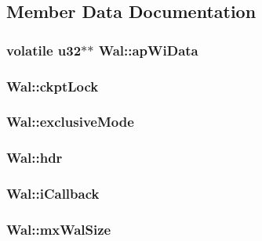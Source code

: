 \subsection{Member Data Documentation}
\hypertarget{struct_wal_a2b0078e3adfd1fb21794561bb12bbfac}{
\subsubsection[{ap\-Wi\-Data}]{\setlength{\rightskip}{0pt plus 5cm}volatile {\bf u32}$\ast$$\ast$ Wal\-::ap\-Wi\-Data}}\label{struct_wal_a2b0078e3adfd1fb21794561bb12bbfac}
\hypertarget{struct_wal_a29153bfb37a9a32f1171e5c1d10994d2}{
\subsubsection[{ckpt\-Lock}]{ Wal\-::ckpt\-Lock}}\label{struct_wal_a29153bfb37a9a32f1171e5c1d10994d2}
\hypertarget{struct_wal_ada255c96ca65d9d8955bbf139af4e6f4}{
\subsubsection[{exclusive\-Mode}]{ Wal\-::exclusive\-Mode}}\label{struct_wal_ada255c96ca65d9d8955bbf139af4e6f4}
\hypertarget{struct_wal_adbeef9e632541fbf07c926652b165906}{
\subsubsection[{hdr}]{ Wal\-::hdr}}\label{struct_wal_adbeef9e632541fbf07c926652b165906}
\hypertarget{struct_wal_aae230a2317817739a5f08ebb28b644b0}{
\subsubsection[{i\-Callback}]{ Wal\-::i\-Callback}}\label{struct_wal_aae230a2317817739a5f08ebb28b644b0}
\hypertarget{struct_wal_a413f9f82c15d31627a2ed6eac9b6cc27}{
\subsubsection[{mx\-Wal\-Size}]{ Wal\-::mx\-Wal\-Size}}\label{struct_wal_a413f9f82c15d31627a2ed6eac9b6cc27}
